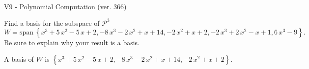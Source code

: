 \begin{exercise}
  \begin{exerciseTitle}V9 - Polynomial Computation (ver. 366)\end{exerciseTitle}
  \begin{exerciseStatement}
    Find a basis for the subspace of \(\mathcal{P}^3\) 
\[W=\mathrm{span}\ \left\{x^{3} + 5 \, x^{2} - 5 \, x + 2 , -8 \, x^{3} - 2 \, x^{2} + x + 14 , -2 \, x^{2} + x + 2 , -2 \, x^{3} + 2 \, x^{2} - x + 1 , 6 \, x^{3} - 9\right\}.\]
 Be sure to explain why your result is a basis.


  \end{exerciseStatement}
  \begin{exerciseAnswer}
   A basis of \(W\) is  \(\left\{x^{3} + 5 \, x^{2} - 5 \, x + 2 , -8 \, x^{3} - 2 \, x^{2} + x + 14 , -2 \, x^{2} + x + 2\right\}\).
  


  \end{exerciseAnswer}
\end{exercise}